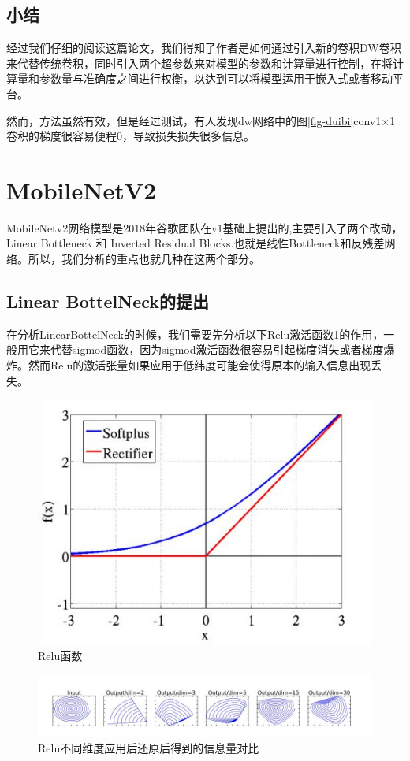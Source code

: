 \documentclass[UTF8,a4paper,12pt]{ctexart}
\begin{document}
 
 
\subsection{小结}
经过我们仔细的阅读这篇论文，我们得知了作者是如何通过引入新的卷积DW卷积来代替传统卷积，同时引入两个超参数来对模型的参数和计算量进行控制，在将计算量和参数量与准确度之间进行权衡，以达到可以将模型运用于嵌入式或者移动平台。

然而，方法虽然有效，但是经过测试，有人发现dw网络中的图\ref{fig-duibi}conv1$\times$1卷积的梯度很容易便程0，导致损失损失很多信息。
 
 
 
 
 
 
 
 
\section{MobileNetV2}
MobileNetv2网络模型是2018年谷歌团队在v1基础上提出的\cite{MOBV2},主要引入了两个改动，Linear Bottleneck 和 Inverted Residual Blocks.也就是线性Bottleneck和反残差网络。所以，我们分析的重点也就几种在这两个部分。


\subsection{Linear BottelNeck的提出}

在分析LinearBottelNeck的时候，我们需要先分析以下Relu激活函数\ref{fig-relu}的作用，一般用它来代替sigmod函数，因为sigmod激活函数很容易引起梯度消失或者梯度爆炸。然而Relu的激活张量如果应用于低纬度可能会使得原本的输入信息出现丢失。
\begin{figure}[htbp]
	\centering
	\includegraphics[width=0.5\linewidth]{webmin/relu.jpg}
	\caption{Relu函数}
	\label{fig-relu}
\end{figure}


\begin{figure}[htbp]
	\centering
	\includegraphics[width=\linewidth]{webmin/relu维度信息.jpg}
	\caption{Relu不同维度应用后还原后得到的信息量对比}
	\label{fig-reluxinxi}
\end{figure}
\end{document}
